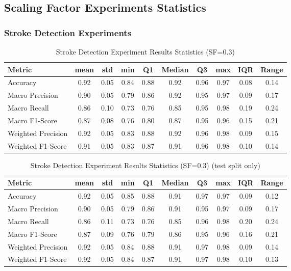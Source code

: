 \subsection{Scaling Factor Experiments Statistics}\label{sf-exps}

\subsubsection{Stroke Detection Experiments}

\begin{table}[h]
\caption{Stroke Detection Experiment Results Statistics (SF=$0.3$)}
\label{tab:sf0.3_Stroke_Detection_Results_Statistics}
\begin{tabular}{|l|c|c|c|c|c|c|c|c|c|}
\toprule
Metric & mean & std & min & Q1 & Median & Q3 & max & IQR & Range \\
\midrule
Accuracy & 0.92 & 0.05 & 0.84 & 0.88 & 0.92 & 0.96 & 0.97 & 0.08 & 0.14 \\
Macro Precision & 0.90 & 0.05 & 0.79 & 0.86 & 0.92 & 0.95 & 0.97 & 0.09 & 0.17 \\
Macro Recall & 0.86 & 0.10 & 0.73 & 0.76 & 0.85 & 0.95 & 0.98 & 0.19 & 0.24 \\
Macro F1-Score & 0.87 & 0.08 & 0.76 & 0.80 & 0.87 & 0.95 & 0.96 & 0.15 & 0.21 \\
Weighted Precision & 0.92 & 0.05 & 0.83 & 0.88 & 0.92 & 0.96 & 0.98 & 0.09 & 0.15 \\
Weighted F1-Score & 0.91 & 0.05 & 0.83 & 0.87 & 0.91 & 0.96 & 0.98 & 0.10 & 0.14 \\
\bottomrule
\end{tabular}
\end{table}

\begin{table}[h]
\caption{Stroke Detection Experiment Results Statistics (SF=$0.3$) (test split only)}
\label{tab:sf0.3_test_Stroke_Detection_Results_Statistics}
\begin{tabular}{|l|c|c|c|c|c|c|c|c|c|}
\toprule
Metric & mean & std & min & Q1 & Median & Q3 & max & IQR & Range \\
\midrule
Accuracy & 0.92 & 0.05 & 0.85 & 0.88 & 0.91 & 0.97 & 0.97 & 0.09 & 0.12 \\
Macro Precision & 0.90 & 0.05 & 0.79 & 0.86 & 0.91 & 0.95 & 0.97 & 0.09 & 0.17 \\
Macro Recall & 0.86 & 0.11 & 0.73 & 0.76 & 0.85 & 0.96 & 0.98 & 0.20 & 0.24 \\
Macro F1-Score & 0.87 & 0.09 & 0.76 & 0.79 & 0.86 & 0.95 & 0.96 & 0.16 & 0.21 \\
Weighted Precision & 0.92 & 0.05 & 0.84 & 0.88 & 0.91 & 0.97 & 0.98 & 0.09 & 0.14 \\
Weighted F1-Score & 0.92 & 0.05 & 0.84 & 0.87 & 0.91 & 0.97 & 0.98 & 0.10 & 0.13 \\
\bottomrule
\end{tabular}
\end{table}

